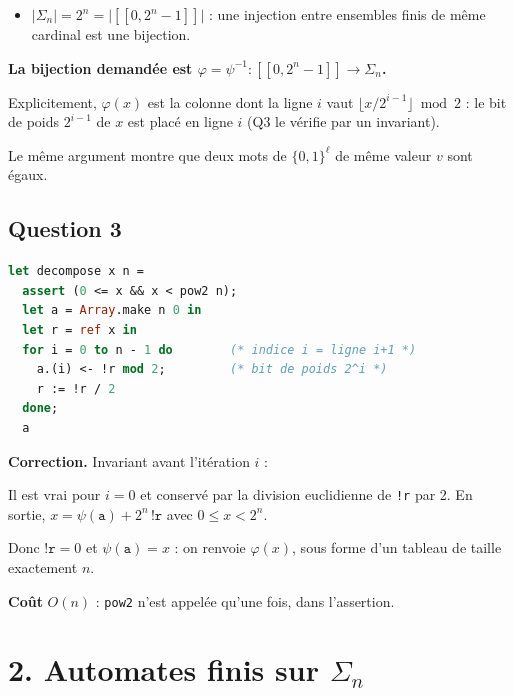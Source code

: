 \documentclass[11pt,a4paper]{article}
\providecommand{\tightlist}{\setlength{\itemsep}{0pt}\setlength{\parskip}{0pt}}
\newcommand{\equationajustee}[1]{%
  \sbox{\boiteequation}{$\displaystyle #1$}%
  \ifdim\wd\boiteequation>\linewidth
    \[\resizebox{\linewidth}{!}{\usebox{\boiteequation}}\]%
  \else
    \[#1\]%
  \fi}
\begin{document}
\begin{itemize}
\tightlist
\item
  \(|\Sigma_n|=2^n=\big|[\![0,2^n-1]\!]\big|\) : une injection entre ensembles finis de même cardinal est une bijection.
\end{itemize}

\textbf{La bijection demandée est \(\varphi=\psi^{-1}:[\![0,2^n-1]\!]\to\Sigma_n\).}

Explicitement, \(\varphi(x)\) est la colonne dont la ligne \(i\) vaut \(\lfloor x/2^{i-1}\rfloor \bmod 2\) : le bit de poids \(2^{i-1}\) de \(x\) est placé en ligne \(i\) (Q3 le vérifie par un invariant).

Le même argument montre que deux mots de \(\{0,1\}^\ell\) de même valeur \(v\) sont égaux.

\hypertarget{question-3}{%
\subsection{Question 3}\label{question-3}}

\begin{lstlisting}[language=Caml]
let decompose x n =
  assert (0 <= x && x < pow2 n);
  let a = Array.make n 0 in
  let r = ref x in
  for i = 0 to n - 1 do        (* indice i = ligne i+1 *)
    a.(i) <- !r mod 2;         (* bit de poids 2^i *)
    r := !r / 2
  done;
  a
\end{lstlisting}

\textbf{Correction.} Invariant avant l'itération \(i\) :

\equationajustee{x=\sum_{j<i}2^j\,\texttt{a.(j)}+2^i\,\texttt{!r}.}

Il est vrai pour \(i=0\) et conservé par la division euclidienne de \texttt{!r} par 2. En sortie, \(x=\psi(\texttt{a})+2^n\,\texttt{!r}\) avec \(0\le x<2^n\).

Donc \(\texttt{!r}=0\) et \(\psi(\texttt{a})=x\) : on renvoie \(\varphi(x)\), sous forme d'un tableau de taille exactement \(n\).

\textbf{Coût} \(O(n)\) : \texttt{pow2} n'est appelée qu'une fois, dans l'assertion.

\hypertarget{automates-finis-sur-sigma_n}{%
\section{\texorpdfstring{2. Automates finis sur \(\Sigma_n\)}{2. Automates finis sur \textbackslash Sigma\_n}}\label{automates-finis-sur-sigma_n}}
\end{document}
